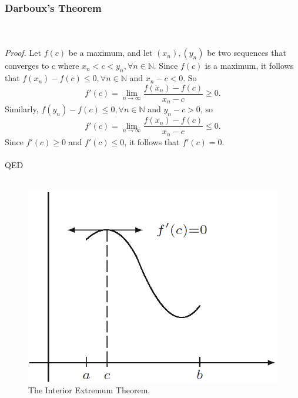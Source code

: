 \documentclass{article}
\begin{document}
            \subsubsection{Darboux's Theorem}
            \\ \\
            \textit{Proof.} Let $f(c)$ be a maximum, and let $(x_n), (y_n)$ be two sequences that converges to $c$ where $x_n < c < y_n, \forall n \in \mathbb{N}$. Since $f(c)$ is a maximum, it follows that $f(x_n) - f(c) \leq 0, \forall n \in \mathbb{N}$ and $x_n - c < 0$. So
            \begin{equation*}
                f'(c) = \lim_{n \to \infty}\frac{f(x_n)-f(c)}{x_n-c} \geq 0.
            \end{equation*}
            Similarly, $f(y_n) - f(c) \leq 0, \forall n \in \mathbb{N}$ and $y_n - c > 0$, so
            \begin{equation*}
                f'(c) = \lim_{n \to \infty}\frac{f(x_n)-f(c)}{x_n-c} \leq 0.
            \end{equation*}
            Since $f'(c) \geq 0$ and $f'(c) \leq 0$, it follows that $f'(c) = 0$.
            \\ \\
            QED
            \\ \\
            \begin{figure}[ht!]
                \centering
                \includegraphics[width=0.5\linewidth]{figs/interior_extremum.png}
                \caption{The Interior Extremum Theorem.}
                \label{fig:my_label}
            \end{figure}
            
\end{document}
